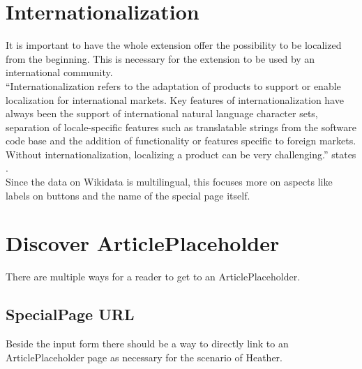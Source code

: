 \section{Internationalization}
It is important to have the whole extension offer the possibility to be localized from the beginning. This is necessary for the extension to be used by an international community. \\ 
``Internationalization refers to the adaptation of products to support or enable localization for international markets. Key features of internationalization have always been the support of international natural language character sets, separation of locale-specific features such as translatable strings from the software code base and the addition of functionality or features specific to foreign markets. Without internationalization, localizing a product can be very challenging.'' states \citet{localization}. \\
Since the data on Wikidata is multilingual, this focuses more on aspects like labels on buttons and the name of the special page itself.

\section{Discover ArticlePlaceholder}

There are multiple ways for a reader to get to an ArticlePlaceholder. 

\subsection{SpecialPage URL}
Beside the input form there should be a way to directly link to an ArticlePlaceholder page as necessary for the scenario of Heather.

